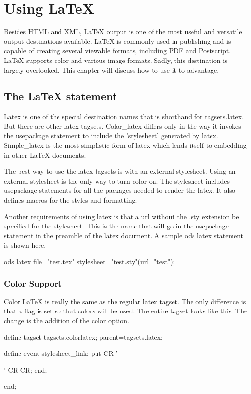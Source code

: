 \chapter{Using LaTeX}
Besides HTML and XML, LaTeX output is one of the most useful
and versatile output destinations available.  LaTeX is commonly
used in publishing and is capable of creating several viewable
formats, including PDF and Postscript.  LaTeX supports color
and various image formats.
Sadly, this destination is largely overlooked.
This chapter will discuss how to use it to advantage. 

\section{The LaTeX statement}
Latex is one of the special destination names that is 
shorthand for tagsets.latex.  But there are other latex
tagsets.  Color\_latex differs only in the way it invokes the
usepackage statement to include the 'stylesheet' generated by
latex.  Simple\_latex is the most simplistic form of latex which
lends itself to embedding in other LaTeX documents.

The best way to use the latex tagsets is with an external stylesheet.
Using an external stylesheet is the only way to turn color on.  The
stylesheet includes usepackage statements for all the packages needed
to render the latex.  It also defines macros for the styles and formatting.

Another requirements of using latex is that a url without the .sty extension
be specified for the stylesheet.  This is the name that will go in the 
usepackage statement in the preamble of the latex document.
A sample ods latex statement is shown here.

\begin{sfvcode}
        ods latex file="test.tex" stylesheet="test.sty"(url="test");
\end{sfvcode}

\subsection{Color Support}
Color LaTeX is really the same as the regular latex tagset.
The only difference is that a flag is set so that colors will
be used.  The entire tagset looks like this.  The change is
the addition of the color option.

\begin{sfvcode}
    define tagset tagsets.colorlatex; 
        parent=tagsets.latex;

        define event stylesheet_link;
            put CR '\usepackage[color]{';
            put URL;
            put '}' CR CR;
        end;

    end;
\end{sfvcode}

